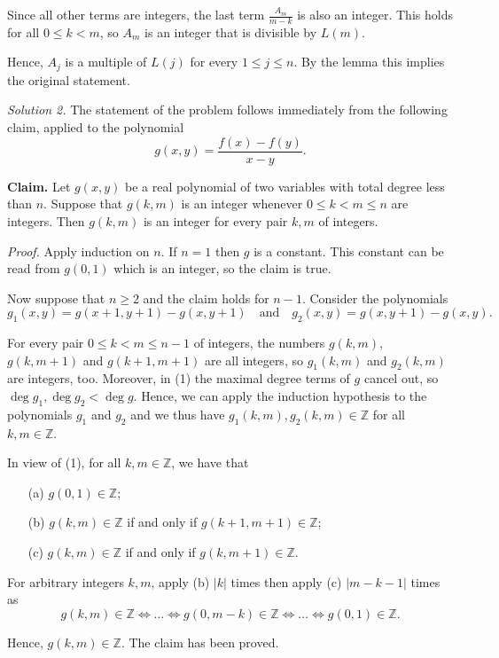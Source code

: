 \documentclass{article}
\begin{document}
Since all other terms are integers, the last term $\frac{A_m}{m - k}$ is also an integer. This holds for all $0 \leq k < m$, so $A_m$ is an integer that is divisible by $L(m)$.

Hence, $A_j$ is a multiple of $L(j)$ for every $1 \leq j \leq n$. By the lemma this implies the original statement.

\textit{Solution 2.} The statement of the problem follows immediately from the following claim, applied to the polynomial
\[
g(x, y) = \frac{f(x) - f(y)}{x - y}.
\]

\textbf{Claim.} Let $g(x, y)$ be a real polynomial of two variables with total degree less than $n$. Suppose that $g(k, m)$ is an integer whenever $0 \leq k < m \leq n$ are integers. Then $g(k, m)$ is an integer for every pair $k, m$ of integers.

\textit{Proof.} Apply induction on $n$. If $n = 1$ then $g$ is a constant. This constant can be read from $g(0, 1)$ which is an integer, so the claim is true.

Now suppose that $n \geq 2$ and the claim holds for $n - 1$. Consider the polynomials
\[
g_1(x, y) = g(x + 1, y + 1) - g(x, y + 1) \quad \text{and} \quad g_2(x, y) = g(x, y + 1) - g(x, y). \tag{1}
\]

For every pair $0 \leq k < m \leq n - 1$ of integers, the numbers $g(k, m)$, $g(k, m + 1)$ and $g(k + 1, m + 1)$ are all integers, so $g_1(k, m)$ and $g_2(k, m)$ are integers, too. Moreover, in (1) the maximal degree terms of $g$ cancel out, so $\deg g_1, \deg g_2 < \deg g$. Hence, we can apply the induction hypothesis to the polynomials $g_1$ and $g_2$ and we thus have $g_1(k, m), g_2(k, m) \in \mathbb{Z}$ for all $k, m \in \mathbb{Z}$.

In view of (1), for all $k, m \in \mathbb{Z}$, we have that

\begin{itemize}
    \item[(a)] $g(0, 1) \in \mathbb{Z}$;
    \item[(b)] $g(k, m) \in \mathbb{Z}$ if and only if $g(k + 1, m + 1) \in \mathbb{Z}$;
    \item[(c)] $g(k, m) \in \mathbb{Z}$ if and only if $g(k, m + 1) \in \mathbb{Z}$.
\end{itemize}

For arbitrary integers $k, m$, apply (b) $|k|$ times then apply (c) $|m - k - 1|$ times as
\[
g(k, m) \in \mathbb{Z} \Leftrightarrow \dots \Leftrightarrow g(0, m - k) \in \mathbb{Z} \Leftrightarrow \dots \Leftrightarrow g(0, 1) \in \mathbb{Z}.
\]

Hence, $g(k, m) \in \mathbb{Z}$. The claim has been proved.
\end{document}
